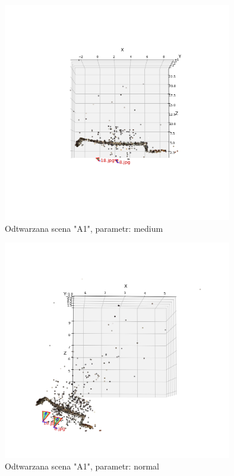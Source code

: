 \begin{figure}[h]
   \centering
   \includegraphics[width=10cm]{preset_A1/medium.png}
   \caption{Odtwarzana scena "A1", parametr: medium}
   \label {fig:preset_A1_medium}
\end{figure}
\begin{figure}[h]
   \centering
   \includegraphics[width=10cm]{preset_A1/normal.png}
   \caption{Odtwarzana scena "A1", parametr: normal}
   \label {fig:preset_A1_normal}
\end{figure}
